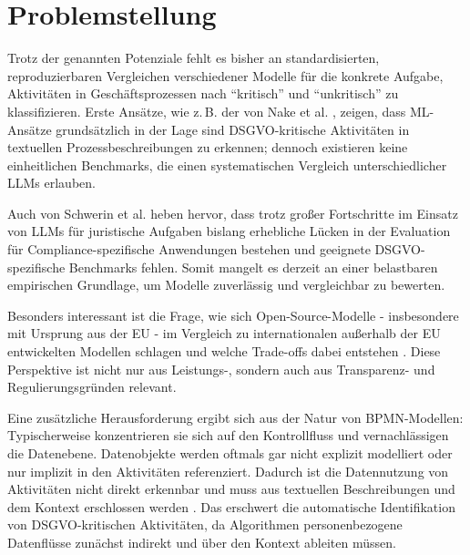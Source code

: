 \section{Problemstellung}\label{sec:problemstellung}

Trotz der genannten Potenziale fehlt es bisher an standardisierten, reproduzierbaren Vergleichen verschiedener Modelle für die konkrete Aufgabe, Aktivitäten in Geschäftsprozessen nach \enquote{kritisch} und \enquote{unkritisch} zu klassifizieren. Erste Ansätze, wie z.\,B. der von Nake et al. \cite{nake2023towards}, zeigen, dass ML-Ansätze grundsätzlich in der Lage sind \ac{DSGVO}-kritische Aktivitäten in textuellen Prozessbeschreibungen zu erkennen; dennoch existieren keine einheitlichen Benchmarks, die einen systematischen Vergleich unterschiedlicher \acp{LLM} erlauben.

Auch von Schwerin et al. \cite{schwerin2024systematic} heben hervor, dass trotz großer Fortschritte im Einsatz von \acp{LLM} für juristische Aufgaben bislang erhebliche Lücken in der Evaluation für Compliance-spezifische Anwendungen bestehen und geeignete \ac{DSGVO}-spezifische Benchmarks fehlen. Somit mangelt es derzeit an einer belastbaren empirischen Grundlage, um Modelle zuverlässig und vergleichbar zu bewerten.

Besonders interessant ist die Frage, wie sich Open-Source-Modelle - insbesondere mit Ursprung aus der \ac{EU} - im Vergleich zu internationalen außerhalb der \ac{EU} entwickelten Modellen schlagen und welche Trade-offs dabei entstehen \cite{schwerin2024systematic}. Diese Perspektive ist nicht nur aus Leistungs-, sondern auch aus Transparenz- und Regulierungsgründen relevant.

Eine zusätzliche Herausforderung ergibt sich aus der Natur von \ac{BPMN}-Modellen: Typischerweise konzentrieren sie sich auf den Kontrollfluss und vernachlässigen die Datenebene. Datenobjekte werden oftmals gar nicht explizit modelliert oder nur implizit in den Aktivitäten referenziert. Dadurch ist die Datennutzung von Aktivitäten nicht direkt erkennbar und muss aus textuellen Beschreibungen und dem Kontext erschlossen werden \cite{schneid2021uncovering}. Das erschwert die automatische Identifikation von \ac{DSGVO}-kritischen Aktivitäten, da Algorithmen personenbezogene Datenflüsse zunächst indirekt und über den Kontext ableiten müssen.